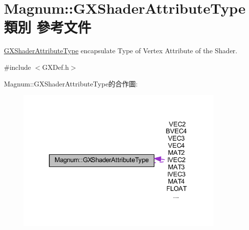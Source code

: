 \hypertarget{class_magnum_1_1_g_x_shader_attribute_type}{}\section{Magnum\+:\+:G\+X\+Shader\+Attribute\+Type 類別 參考文件}
\label{class_magnum_1_1_g_x_shader_attribute_type}


\hyperlink{class_magnum_1_1_g_x_shader_attribute_type}{G\+X\+Shader\+Attribute\+Type} encapsulate Type of Vertex Attribute of the Shader.  




{\ttfamily \#include $<$G\+X\+Def.\+h$>$}



Magnum\+:\+:G\+X\+Shader\+Attribute\+Type的合作圖\+:\nopagebreak
\begin{figure}[H]
\begin{center}
\leavevmode
\includegraphics[width=292pt]{class_magnum_1_1_g_x_shader_attribute_type__coll__graph}
\end{center}
\end{figure}
